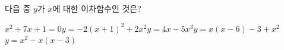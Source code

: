 다음 중 $y$가 $x$에 대한 이차함수인 것은?
\begin{choicesii}{$x^2+7x+1=0$}{$y=-2(x+1)^2+2x^2$}{$y=4x-5x^3$}{$y=x(x-6)-3+x^2$}{$y=x^2-x(x-3)$}\end{choicesii}
